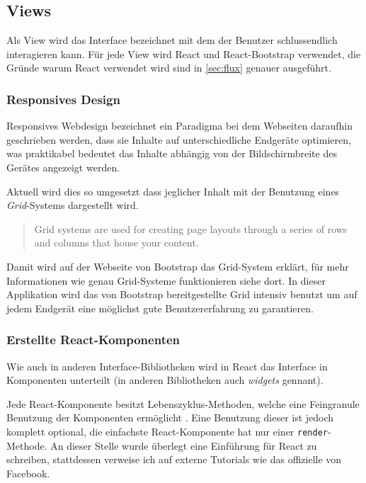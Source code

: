 \documentclass[12pt,twoside]{book}
\begin{document}
\subsection{Views}

Als View wird das Interface bezeichnet mit dem der Benutzer schlussendlich interagieren kann. Für jede View wird React und React-Bootstrap verwendet, die Gründe warum React verwendet wird sind in \ref{sec:flux} genauer ausgeführt.

\subsubsection{Responsives Design}

Responsives Webdesign bezeichnet ein Paradigma bei dem Webseiten daraufhin geschrieben werden, dass sie Inhalte auf unterschiedliche Endgeräte optimieren, was praktikabel bedeutet das Inhalte abhängig von der Bildschirmbreite des Gerätes angezeigt werden.

Aktuell wird dies so umgesetzt dass jeglicher Inhalt mit der Benutzung eines \textit{Grid}-Systems dargestellt wird.

\begin{quote}
	Grid systems are used for creating page layouts through a series of rows and columns that house your content.
\end{quote}

Damit wird auf der Webseite von Bootstrap \cite{bootstrap} das Grid-System erklärt, für mehr Informationen wie genau Grid-Systeme funktionieren siehe dort.
In dieser Applikation wird das von Bootstrap bereitgestellte Grid intensiv benutzt um auf jedem Endgerät eine möglichst gute Benutzererfahrung zu garantieren.

\subsubsection{Erstellte React-Komponenten}

Wie auch in anderen Interface-Bibliotheken wird in React das Interface in Komponenten unterteilt (in anderen Bibliotheken auch \textit{widgets} gennant).

Jede React-Komponente besitzt Lebenszyklus-Methoden, welche eine Feingranule Benutzung der Komponenten ermöglicht \cite{lifecycle}.
Eine Benutzung dieser ist jedoch komplett optional, die einfachste React-Komponente hat nur einer \texttt{render}-Methode. An dieser Stelle wurde überlegt eine Einführung für React zu schreiben, stattdessen verweise ich auf externe Tutorials wie das offizielle von Facebook\cite{tutorial}.
\end{document}
